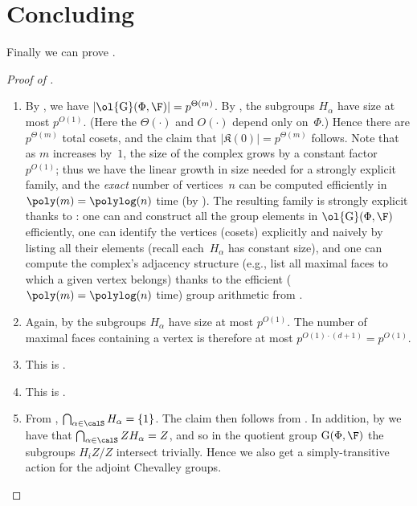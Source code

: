 \documentclass[11pt]{article}
\newcommand{\Esc}[2]{\ol{\mathrm{G}}(#1,#2)}
\newcommand{\G}[2]{\mathrm{G}(#1,#2)}
\newcommand{\complex}{\mathfrak{K}}
\begin{document}
\section{Concluding}
Finally we can prove .
\begin{proof}[Proof of ]
\quad
\begin{enumerate}
\item By , we have $|\Esc{\Phi}{\F}| = p^{\Theta(m)}$.
    By , the subgroups $H_\alpha$ have size at most $p^{O(1)}$.
    (Here the $\Theta(\cdot)$ and $O(\cdot)$ depend only on~$\Phi$.)
    Hence there are $p^{\Theta(m)}$ total cosets, and the claim that $|\complex(0)| = p^{\Theta(m)}$ follows.
    Note that as $m$ increases by~$1$, the size of the complex grows by a constant factor~$p^{O(1)}$; thus we have the linear growth in size needed for a strongly explicit family, and the \emph{exact} number of vertices~$n$ can be computed efficiently in $\poly(m) = \polylog(n)$ time (by ).  The resulting family is strongly explicit thanks to : one can and construct all the group elements in $\Esc{\Phi}{\F}$ efficiently, one can identify the vertices (cosets) explicitly and naively by listing all their elements (recall each~$H_\alpha$ has constant size), and one can compute the complex's adjacency structure (e.g., list all maximal faces to which a given vertex belongs) thanks to the efficient ($\poly(m) = \polylog(n)$ time) group arithmetic from .
\item Again, by  the subgroups $H_\alpha$ have size at most $p^{O(1)}$. The number of maximal faces containing a vertex is therefore at most $p^{O(1)\cdot (d+1)} = p^{O(1)}$.
\item This is .
\item This is .
\item From , $\bigcap_{\alpha \in \calS} H_\alpha = \{1\}$. The claim then follows from .  In addition, by  we have that $\bigcap_{\alpha \in \calS} Z H_\alpha = Z$, and so in the quotient group $\G{\Phi}{\F}$ the subgroups $H_i Z/Z$ intersect trivially. Hence we also get a simply-transitive action for the adjoint Chevalley groups.\qedhere
\end{enumerate}

\end{proof}
\end{document}
